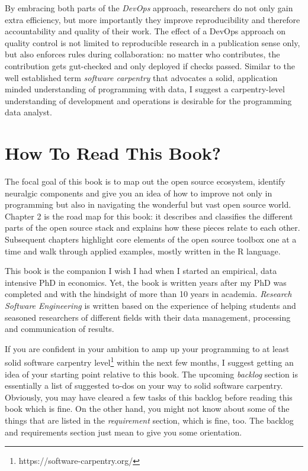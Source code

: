 \documentclass[
  12pt,
  letterpaper,
]{krantz}
\begin{document}
By embracing both parts of the \emph{DevOps} approach,
researchers do not only gain extra efficiency, but more importantly they
improve reproducibility and therefore accountability and quality of
their work. The effect of a DevOps approach on quality
control is not limited to reproducible research in a publication sense
only, but also enforces rules during collaboration: no matter who
contributes, the contribution gets gut-checked and only deployed if
checks passed. Similar to the well established term \emph{software
carpentry} that advocates a solid, application minded understanding of
programming with data, I suggest a carpentry-level understanding of
development and operations is desirable for the programming data
analyst.

\hypertarget{how-to-read-this-book}{%
\section{How To Read This Book?}\label{how-to-read-this-book}}

The focal goal of this book is to map out the open source ecosystem,
identify neuralgic components and give you an idea of how to improve not
only in programming but also in navigating the wonderful but vast open
source world. Chapter 2 is the road map for this book: it describes and
classifies the different parts of the open source stack and
explains how these pieces relate to each other. Subsequent chapters
highlight core elements of the open source toolbox one at a time and
walk through applied examples, mostly written in the R language.

This book is the companion I wish I had when I started an empirical,
data intensive PhD in economics. Yet, the book is written years after my
PhD was completed and with the hindsight of more than 10 years in
academia. \emph{Research Software Engineering} is written based on the
experience of helping students and seasoned researchers of different
fields with their data management, processing and communication of
results.

If you are confident in your ambition to amp up your programming to at
least solid software carpentry
level\footnote{https://software-carpentry.org/} within the next few
months, I suggest getting an idea of your starting point relative to
this book. The upcoming \emph{backlog} section is essentially a list of
suggested to-dos on your way to solid software carpentry. Obviously, you
may have cleared a few tasks of this backlog before reading this book
which is fine. On the other hand, you might not know about some of the
things that are listed in the \emph{requirement} section, which is fine,
too. The backlog and requirements section just mean to give you some
orientation.
\end{document}
